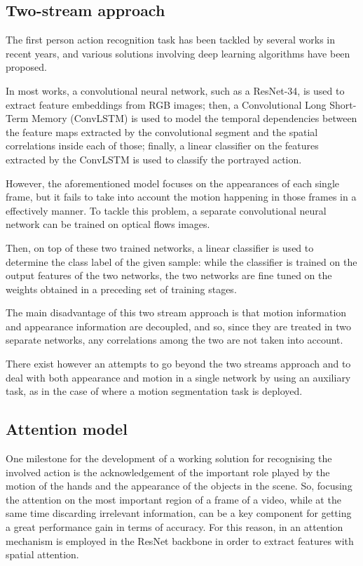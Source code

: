 \documentclass[10pt,twocolumn,letterpaper]{article}
\begin{document}
\subsection{Two-stream approach}

The first person action recognition task has been tackled by several works in recent years, and various solutions involving deep learning algorithms have been proposed.

In most works, a convolutional neural network, such as a ResNet-34, is used to extract feature embeddings from RGB images; then, a Convolutional Long Short-Term Memory (ConvLSTM) is used to model the temporal dependencies between the feature maps extracted by the convolutional segment and the spatial correlations inside each of those; finally, a linear classifier on the features extracted by the ConvLSTM is used to classify the portrayed action.

However, the aforementioned model focuses on the appearances of each single frame, but it fails to take into account the motion happening in those frames in a effectively manner. To tackle this problem, a separate convolutional neural network can be trained on optical flows images.

Then, on top of these two trained networks, a linear classifier is used to determine the class label of the given sample: while the classifier is trained on the output features of the two networks, the two networks are fine tuned on the weights obtained in a preceding set of training stages.

The main disadvantage of this two stream approach is that motion information and appearance information are decoupled, and so, since they are treated in two separate networks, any correlations among the two are not taken into account.

There exist however an attempts to go beyond the two streams approach and to deal with both appearance and motion in a single network by using an auxiliary task, as in the case of \cite{planamente2020joint} where a motion segmentation task is deployed.

\subsection{Attention model}
\label{par:AttentionModel}
One milestone for the development of a working solution for recognising the involved action is the acknowledgement of the important role played by the motion of the hands and the appearance of the objects in the scene. So, focusing the attention on the most important region of a frame of a video, while at the same time discarding irrelevant information, can be a key component for getting a great performance gain in terms of accuracy. For this reason, in \cite{Ego-RNN} an attention mechanism is employed in the ResNet backbone in order to extract features with spatial attention.
\end{document}

